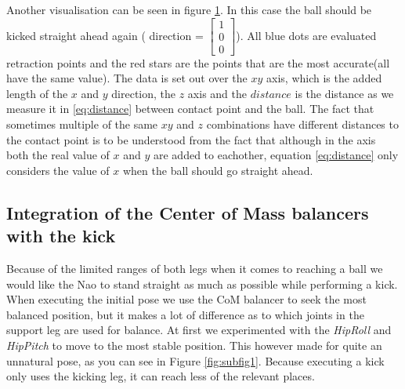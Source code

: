 \documentclass[a4paper]{article}
\begin{document}
Another visualisation can be seen in figure \ref{fig:retraction_plot3}. In this
case the ball should be kicked straight ahead again ( direction = $\begin{bmatrix} 1 \\  0 \\ 0 \end{bmatrix}$). All blue dots are evaluated retraction points and the red stars are the points that are the most
accurate(all have the same value). The data is set out over the $xy$ axis, which
is the added length of the $x$ and $y$ direction, the $z$ axis and the
$distance$ is the distance as we measure it in \ref{eq:distance} between contact point and the ball. The fact that sometimes multiple of the same $xy$ and $z$
combinations have different distances to the contact point is to be understood from
the fact that although in the axis both the real value of $x$ and $y$ are added to
eachother, equation \ref{eq:distance} only considers the value of $x$ when the ball should go
straight ahead.

\begin{figure}[htbp]
  \centering
  \caption{
         }
  \label{fig:retraction_plot3}
\end{figure}

\FloatBarrier

\subsection{Integration of the Center of Mass balancers with the kick}
Because of the limited ranges of both legs when it comes to reaching a ball we
would like the Nao to stand straight as much as possible while performing a kick. 
When executing the initial pose we use the CoM balancer to seek the most
balanced position, but it makes a lot of difference as to which joints in the
support leg are used for balance. At first we experimented  with the
\emph{HipRoll} and \emph{HipPitch} to move to the most stable position. This
however made for quite an unnatural pose, as you can see in Figure
\ref{fig:subfig1}. Because executing a kick only uses the kicking leg, it can
reach less of the relevant places. 
\end{document}
